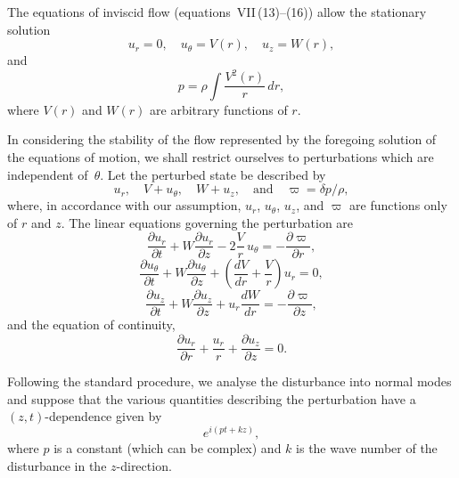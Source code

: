 The equations of inviscid flow (equations~VII\,(13)--(16)) allow the stationary solution
\begin{equation}
\label{eq:8-66}
u_r = 0, \quad u_\theta = V(r), \quad u_z = W(r),
\end{equation}
and
\begin{equation}
\label{eq:8-67}
p = \rho\int \frac{V^2(r)}{r}\,dr,
\end{equation}
where $V(r)$ and $W(r)$ are arbitrary functions of $r$.

In considering the stability of the flow represented by the foregoing solution of the equations of motion, we shall restrict ourselves to perturbations which are independent of~$\theta$. Let the perturbed state be described by
\begin{equation}
\label{eq:8-68}
u_r,\quad V + u_\theta,\quad W + u_z, \quad \text{and} \quad \varpi = \delta p/\rho,
\end{equation}
where, in accordance with our assumption, $u_r$, $u_\theta$, $u_z$, and $\varpi$ are functions only of $r$ and $z$. The linear equations governing the perturbation are
\begin{equation}
\label{eq:8-69}
\frac{\partial u_r}{\partial t} + W\frac{\partial u_r}{\partial z} - 2\frac{V}{r}\,u_\theta = -\frac{\partial\varpi}{\partial r},
\end{equation}
\begin{equation}
\label{eq:8-70}
\frac{\partial u_\theta}{\partial t} + W\frac{\partial u_\theta}{\partial z} + \left(\frac{dV}{dr} + \frac{V}{r}\right)u_r = 0,
\end{equation}
\begin{equation}
\label{eq:8-71}
\frac{\partial u_z}{\partial t} + W\frac{\partial u_z}{\partial z} + u_r\frac{dW}{dr} = -\frac{\partial\varpi}{\partial z},
\end{equation}
and the equation of continuity,
\begin{equation}
\label{eq:8-72}
\frac{\partial u_r}{\partial r} + \frac{u_r}{r} + \frac{\partial u_z}{\partial z} = 0.
\end{equation}

Following the standard procedure, we analyse the disturbance into normal modes and suppose that the various quantities describing the perturbation have a $(z,t)$-dependence given by
\begin{equation}
\label{eq:8-73}
e^{i(pt+kz)},
\end{equation}
where $p$ is a constant (which can be complex) and $k$ is the wave number of the disturbance in the $z$-direction.

